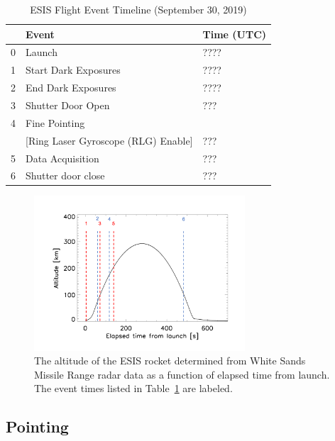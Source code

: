 
\begin{center}
\begin{table}[ht]
\caption{ESIS Flight Event Timeline (September 30, 2019)}
\begin{tabular}{lll}\hline
{\bf} & {\bf Event} & {\bf Time (UTC)}\\ \hline
0 & Launch        &    ???? \\
1 & Start Dark Exposures  &  ????\\
2 & End Dark  Exposures  &  ????\\
3 & Shutter Door Open     &   ??? \\
4 & Fine Pointing    &    \\
 & [Ring Laser Gyroscope (RLG) Enable] & ???\\
5 & Data Acquisition     &     ???\\
6 & Shutter door close    &   ??? \\ \hline
\end{tabular}
\label{tab:timeline}
\end{table}
\end{center}

\begin{figure}[ht]
\begin{center}
\includegraphics[width=0.7\textwidth]{figures/altevents.png}
\caption{The altitude of the ESIS rocket determined from White Sands Missile Range radar data as a function of elapsed time from launch.  The event times listed in Table~\ref{tab:timeline} are labeled.}
\label{fig:timeline}
\end{center}
\end{figure}


\subsection{Pointing} \label{sec:point}

